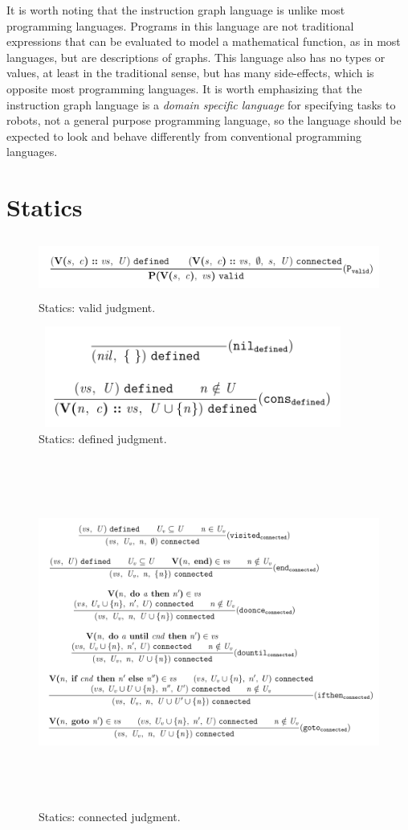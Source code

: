 \documentclass{sig-alternate-05-2015}
\begin{document}
It is worth noting that the instruction graph language is unlike most
programming languages. Programs in this language are not traditional expressions
that can be evaluated to model a mathematical function, as in most languages,
but are descriptions of graphs. This language also has no types or values, at
least in the traditional sense, but has many side-effects, which is opposite
most programming languages. It is worth emphasizing that the instruction graph
language is a \textit{domain specific language} for specifying tasks to robots,
not a general purpose programming language, so the language should be expected
to look and behave differently from conventional programming languages.

\section{Statics}

\begin{figure}
\centering
\includegraphics[height=0.75in, width=6in]{images/valid.png}
\caption{Statics: valid judgment.}
\end{figure}

\begin{figure}
\centering
\includegraphics[height=1.3in, width=4in]{images/defined.png}
\caption{Statics: defined judgment.}
\end{figure}

\begin{figure}
\centering
\includegraphics[height=4.5in, width=7in]{images/connected.png}
\caption{Statics: connected judgment.}
\end{figure}
\end{document}
